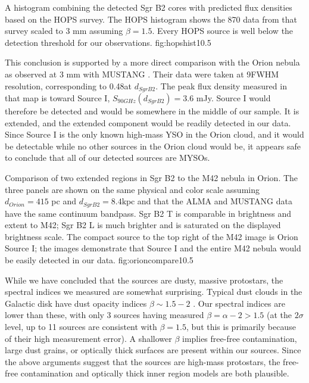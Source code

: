\documentclass[twocolumn]{aastex61}
\newcommand{\dsgrb}{\ensuremath{8.4 \textrm{kpc}}\xspace}
\begin{document}
{A histogram combining the detected Sgr B2 cores with predicted flux densities
based on the HOPS \citep{Furlan2016a} survey.  The HOPS histogram shows the 870
\um data from that survey scaled to 3 mm assuming $\beta=1.5$.  Every HOPS
source is well below the detection threshold for our observations.}
{fig:hopshist}{1}{0.5\textwidth}

This conclusion is supported by a more direct comparison with the Orion nebula
as observed at 3 mm with MUSTANG \citep[][Figure
\ref{fig:orioncompare}]{Dicker2009a}.  Their data were taken at
9\arcsec FWHM resolution, corresponding to 0.48\arcsec at $d_{Sgr B2}$.  The
peak flux density measured in that map is toward Source I, $S_{90 GHz}(d_{Sgr
B2}) = 3.6$ mJy.  Source I would therefore  be detected and would be
somewhere in the middle of our sample.  It is  extended, and the
extended component would be readily detected in our data. 
Since Source I is the only known high-mass YSO in the Orion cloud, and it would
be detectable while no other sources in the Orion cloud would be, it appears
safe to conclude that all of our detected sources are MYSOs.


{Comparison of two extended \hii regions in Sgr B2 to the M42 nebula in Orion.
The three panels are shown on the same physical and color scale assuming
$d_{Orion} = 415$ pc and $d_{Sgr B2} = $\dsgrb and that the ALMA and MUSTANG
data have the same continuum bandpass.  Sgr B2 \hii T is comparable in
brightness and extent to M42; Sgr B2 \hii L is much brighter and is saturated
on the displayed brightness scale.  The compact source to the top right of the
M42 image is Orion Source I; the images demonstrate that Source I and the entire
M42 nebula would be easily detected in our data.
}
{fig:orioncompare}{1}{0.5\textwidth}

While we have concluded that the sources are dusty, massive protostars, the
spectral indices we measured are somewhat surprising.  Typical dust clouds in
the Galactic disk have dust opacity indices $\beta\sim1.5-2$
\citep{Schnee2010a,Shirley2011a,Sadavoy2016a}.  Our spectral indices are lower
than these, with only 3 sources having measured $\beta=\alpha-2 > 1.5$ (at the
$2\sigma$ level, up to 11 sources are consistent with $\beta=1.5$, but this is
primarily because of their high measurement error).  A shallower $\beta$
implies free-free contamination, large dust grains, or optically thick surfaces
are present within our sources.  Since the above arguments suggest that the
sources are high-mass protostars, the free-free contamination and optically
thick inner region models are both plausible.
\end{document}
